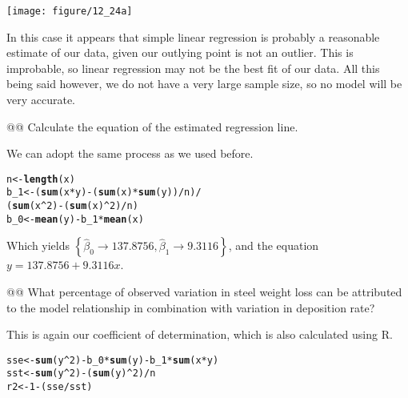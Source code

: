 \documentclass[10pt]{article}\usepackage[]{graphicx}\usepackage[]{xcolor}
\makeatletter
\def\maxwidth{ %
  \ifdim\Gin@nat@width>\linewidth
    \linewidth
  \else
    \Gin@nat@width
  \fi
}
\newcommand{\hlnum}[1]{\textcolor[rgb]{0.686,0.059,0.569}{#1}}%
\newcommand{\hlopt}[1]{\textcolor[rgb]{0,0,0}{#1}}%
\newcommand{\hlstd}[1]{\textcolor[rgb]{0.345,0.345,0.345}{#1}}%
\newcommand{\hlkwb}[1]{\textcolor[rgb]{0.69,0.353,0.396}{#1}}%
\newcommand{\hlkwd}[1]{\textcolor[rgb]{0.737,0.353,0.396}{\textbf{#1}}}%
\newenvironment{kframe}{%
 \def\at@end@of@kframe{}%
 \ifinner\ifhmode%
  \def\at@end@of@kframe{\end{minipage}}%
  \begin{minipage}{\columnwidth}%
 \fi\fi%
 \def\FrameCommand##1{\hskip\@totalleftmargin \hskip-\fboxsep
 \colorbox{shadecolor}{##1}\hskip-\fboxsep
     \hskip-\linewidth \hskip-\@totalleftmargin \hskip\columnwidth}%
 \MakeFramed {\advance\hsize-\width
   \@totalleftmargin\z@ \linewidth\hsize
   \@setminipage}}%
 {\par\unskip\endMakeFramed%
 \at@end@of@kframe}
\newenvironment{knitrout}{}{} %
\makeatother
\begin{document}
\begin{easylist}[enumerate]
\begin{knitrout}
{\centering \texttt{[image: figure/12\_24a]} 

}



\end{knitrout}


    In this case it appears that simple linear regression is probably a reasonable estimate of our data, given our
    outlying point is not an outlier. This is improbable, so linear regression may not be the best fit of our data. All
    this being said however, we do not have a very large sample size, so no model will be very accurate.

    @@ Calculate the equation of the estimated regression line.\newline

    We can adopt the same process as we used before.

\begin{knitrout}
\color{fgcolor}\begin{kframe}
\begin{alltt}
         \hlstd{n} \hlkwb{<-} \hlkwd{length}\hlstd{(x)}
         \hlstd{b_1} \hlkwb{<-} \hlstd{(}\hlkwd{sum}\hlstd{(x} \hlopt{*} \hlstd{y)} \hlopt{-} \hlstd{(}\hlkwd{sum}\hlstd{(x)} \hlopt{*} \hlkwd{sum}\hlstd{(y))}\hlopt{/}\hlstd{n)} \hlopt{/}
                 \hlstd{(}\hlkwd{sum}\hlstd{(x}\hlopt{^}\hlnum{2}\hlstd{)} \hlopt{-} \hlstd{(}\hlkwd{sum}\hlstd{(x)}\hlopt{^}\hlnum{2}\hlstd{)}\hlopt{/}\hlstd{n)}
         \hlstd{b_0} \hlkwb{<-} \hlkwd{mean}\hlstd{(y)} \hlopt{-} \hlstd{b_1} \hlopt{*} \hlkwd{mean}\hlstd{(x)}
\end{alltt}
\end{kframe}
\end{knitrout}


    Which yields $\boxed{\left\{ \hat{\beta}_0 \to 137.8756, \hat{\beta}_1 \to 9.3116 \right\}}$, and the
    equation $y = 137.8756 + 9.3116 x$.

    @@ What percentage of observed variation in steel weight loss can be attributed to the model relationship in
    combination with variation in deposition rate?\newline

    This is again our coefficient of determination, which is also calculated using R.

\begin{knitrout}
\color{fgcolor}\begin{kframe}
\begin{alltt}
         \hlstd{sse} \hlkwb{<-} \hlkwd{sum}\hlstd{(y}\hlopt{^}\hlnum{2}\hlstd{)} \hlopt{-} \hlstd{b_0} \hlopt{*} \hlkwd{sum}\hlstd{(y)} \hlopt{-} \hlstd{b_1} \hlopt{*} \hlkwd{sum}\hlstd{(x} \hlopt{*} \hlstd{y)}
         \hlstd{sst} \hlkwb{<-} \hlkwd{sum}\hlstd{(y}\hlopt{^}\hlnum{2}\hlstd{)} \hlopt{-} \hlstd{(}\hlkwd{sum}\hlstd{(y)}\hlopt{^}\hlnum{2}\hlstd{)}\hlopt{/}\hlstd{n}
         \hlstd{r2} \hlkwb{<-} \hlnum{1} \hlopt{-}\hlstd{(sse} \hlopt{/} \hlstd{sst)}
\end{alltt}
\end{kframe}
\end{knitrout}



\end{easylist}
\end{document}
